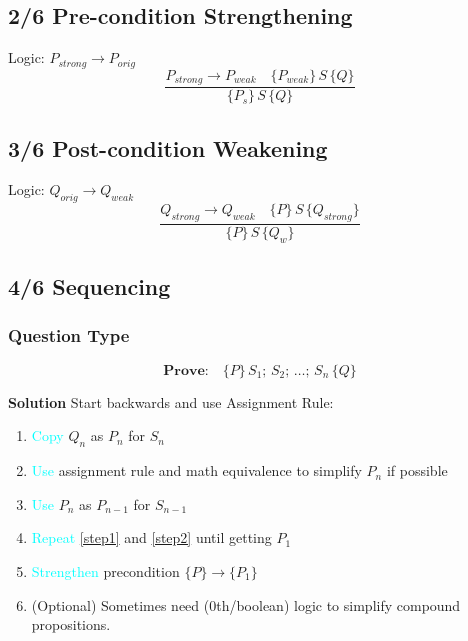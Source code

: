 \subsection*{2/6 Pre-condition Strengthening}

Logic: \(P_{strong} \rightarrow P_{orig} \)
\begin{displaymath}
  \frac{P_{strong} \rightarrow P_{weak} \quad \{P_{weak}\}\,S\,\{Q\} } {\{P_{s}\}\,S\,\{Q\}}
\end{displaymath}

\subsection*{3/6 Post-condition Weakening}
Logic: \(Q_{orig} \rightarrow Q_{weak} \)
\begin{displaymath}
  \frac{Q_{strong}\rightarrow Q_{weak} \quad \{P\}\,S\,\{Q_{strong}\} } {\{P\}\,S\,\{Q_{w}\}}
\end{displaymath}

\subsection*{4/6 Sequencing}
\subsubsection*{Question Type}
{
  \setlength{\abovedisplayskip}{0pt}
  \setlength{\belowdisplayskip}{3pt}
  \setlength{\abovedisplayshortskip}{0pt}
  \setlength{\belowdisplayshortskip}{3pt}

  \[\textbf{Prove:}\quad \{P\}\,S_{1};\,S_{2};\,\ldots ;\,S_{n}\,\{Q\}\]
}
\textbf{Solution} Start backwards and use Assignment Rule:
\begin{enumerate}
\item\label{step1} \textcolor{Cyan}{Copy} \(Q_{n}\) as \(P_{n}\) for \(S_{n}\)
\item\label{step2} \textcolor{Cyan}{Use} assignment rule and math equivalence to simplify \(P_{n}\) if possible
\item \textcolor{Cyan}{Use} \(P_{n}\) as \(P_{n-1}\) for \(S_{n-1}\)
\item \textcolor{Cyan}{Repeat} \ref{step1} and \ref{step2} until getting \(P_{1}\)
\item \textcolor{Cyan}{Strengthen} precondition \(\{P\}\rightarrow \{P_{1}\}\)
\item (Optional) Sometimes need (0th/boolean) logic to simplify compound propositions.

\end{enumerate}

